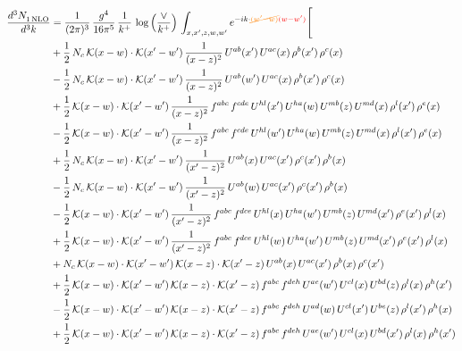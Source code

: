 \documentclass[9pt]{article}
\numberwithin{equation}{section}
\begin{document}
\begin{align}
    \frac{d^{3}N_{1\,\rm NLO}^{\rm}}{d^{3}k}  & = \frac{1}{(2\pi)^{3}}\,\frac{g^{4}}{16\pi^{5}}\,\frac{1}{k^{+}}\,\log{\left(\frac{\vee}{k^{+}}\right)}\, \int_{x,x',z,w,w'}e^{-ik\cdot{\color{orange}\cancel{(w'-w)}}{\color{red}(w-w')}}\Bigg[\notag\\ &+\frac{1}{2}\,N_{c}\,\mathcal{K}(x-w)\cdot\mathcal{K}(x'-w')\,\frac{1}{(x-z)^{2}}\,U^{ab}(x')\,U^{ac}(x)\,\rho^{b}(x')\,\rho^{c}(x)\notag \\ 
&-\frac{1}{2}\,N_{c}\,\mathcal{K}(x-w)\cdot\mathcal{K}(x'-w')\,\frac{1}{(x-z)^{2}}\,U^{ab}(w')\,U^{ac}(x)\,\rho^{b}(x')\,\rho^{c}(x)\notag \\ 
&+\frac{1}{2}\,\mathcal{K}(x-w)\cdot\mathcal{K}(x'-w')\,\frac{1}{(x-z)^{2}}\,f^{abc}\,f^{cde}\,U^{hl}(x')\,U^{ha}(w)\,U^{mb}(z)\,U^{md}(x)\,\rho^{l}(x')\,\rho^{e}(x)\notag \\ 
&-\frac{1}{2}\,\mathcal{K}(x-w)\cdot\mathcal{K}(x'-w')\,\frac{1}{(x-z)^{2}}\,f^{abc}\,f^{cde}\,U^{hl}(w')\,U^{ha}(w)\,U^{mb}(z)\,U^{md}(x)\,\rho^{l}(x')\,\rho^{e}(x)\notag \\ 
&+\frac{1}{2}\,N_{c}\,\mathcal{K}(x-w)\cdot\mathcal{K}(x'-w')\,\frac{1}{(x'-z)^{2}}\,U^{ab}(x)\,U^{ac}(x')\,\rho^{c}(x')\,\rho^{b}(x)\notag \\ 
&-\frac{1}{2}\,N_{c}\,\mathcal{K}(x-w)\cdot\mathcal{K}(x'-w')\,\frac{1}{(x'-z)^{2}}\,U^{ab}(w)\,U^{ac}(x')\,\rho^{c}(x')\,\rho^{b}(x)\notag \\ 
&-\frac{1}{2}\,\mathcal{K}(x-w)\cdot\mathcal{K}(x'-w')\,\frac{1}{(x'-z)^{2}}\,f^{abc}\,f^{dce}\,U^{hl}(x)\,U^{ha}(w')\,U^{mb}(z)\,U^{md}(x')\,\rho^{e}(x')\,\rho^{l}(x)\notag \\ 
&+\frac{1}{2}\,\mathcal{K}(x-w)\cdot\mathcal{K}(x'-w')\,\frac{1}{(x'-z)^{2}}\,f^{abc}\,f^{dce}\,U^{hl}(w)\,U^{ha}(w')\,U^{mb}(z)\,U^{md}(x')\,\rho^{e}(x')\,\rho^{l}(x)\notag \\ 
&+N_{c}\,\mathcal{K}(x-w)\cdot\mathcal{K}(x'-w')\,\mathcal{K}(x-z)\cdot\mathcal{K}(x'-z)\,U^{ab}(x)\,U^{ac}(x')\,\rho^{b}(x)\,\rho^{c}(x')\notag \\ 
&+\frac{1}{2}\,\mathcal{K}(x-w)\cdot\mathcal{K}(x'-w')\,\mathcal{K}(x-z)\cdot\mathcal{K}(x'-z)\,f^{abc}\,f^{deh}\,U^{ae}(w')\,U^{cl}(x)\,U^{bd}(z)\,\rho^{l}(x)\,\rho^{h}(x')\notag \\ 
&-\frac{1}{2}\,\mathcal{K}(x-w)\cdot\mathcal{K}(x'-w')\,\mathcal{K}(x-z)\cdot\mathcal{K}(x'-z)\,f^{abc}\,f^{deh}\,U^{ad}(w)\,U^{cl}(x')\,U^{be}(z)\,\rho^{l}(x')\,\rho^{h}(x)\notag \\ 
&+\frac{1}{2}\,\mathcal{K}(x-w)\cdot\mathcal{K}(x'-w')\,\mathcal{K}(x-z)\cdot\mathcal{K}(x'-z)\,f^{abc}\,f^{deh}\,U^{ae}(w')\,U^{cl}(x)\,U^{bd}(x')\,\rho^{l}(x)\,\rho^{h}(x')\notag \\ 

\end{align}
\end{document}
